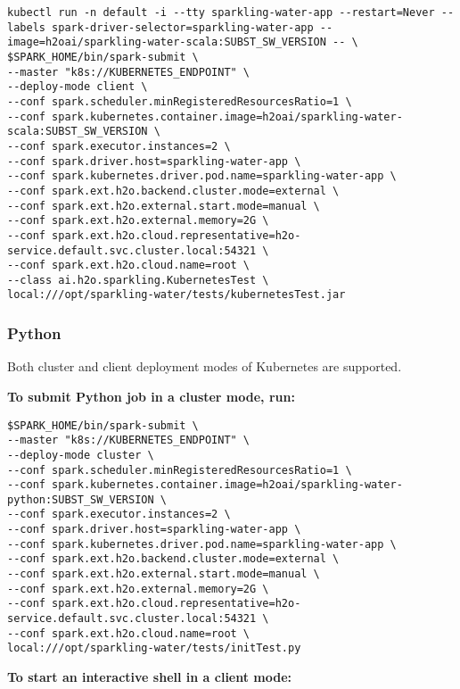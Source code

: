 \begin{lstlisting}[style=Bash]
kubectl run -n default -i --tty sparkling-water-app --restart=Never --labels spark-driver-selector=sparkling-water-app --image=h2oai/sparkling-water-scala:SUBST_SW_VERSION -- \
$SPARK_HOME/bin/spark-submit \
--master "k8s://KUBERNETES_ENDPOINT" \
--deploy-mode client \
--conf spark.scheduler.minRegisteredResourcesRatio=1 \
--conf spark.kubernetes.container.image=h2oai/sparkling-water-scala:SUBST_SW_VERSION \
--conf spark.executor.instances=2 \
--conf spark.driver.host=sparkling-water-app \
--conf spark.kubernetes.driver.pod.name=sparkling-water-app \
--conf spark.ext.h2o.backend.cluster.mode=external \
--conf spark.ext.h2o.external.start.mode=manual \
--conf spark.ext.h2o.external.memory=2G \
--conf spark.ext.h2o.cloud.representative=h2o-service.default.svc.cluster.local:54321 \
--conf spark.ext.h2o.cloud.name=root \
--class ai.h2o.sparkling.KubernetesTest \
local:///opt/sparkling-water/tests/kubernetesTest.jar
\end{lstlisting}


\subsubsection{Python}

Both cluster and client deployment modes of Kubernetes are supported.

\textbf{To submit Python job in a cluster mode, run:}

\begin{lstlisting}[style=Bash]
$SPARK_HOME/bin/spark-submit \
--master "k8s://KUBERNETES_ENDPOINT" \
--deploy-mode cluster \
--conf spark.scheduler.minRegisteredResourcesRatio=1 \
--conf spark.kubernetes.container.image=h2oai/sparkling-water-python:SUBST_SW_VERSION \
--conf spark.executor.instances=2 \
--conf spark.driver.host=sparkling-water-app \
--conf spark.kubernetes.driver.pod.name=sparkling-water-app \
--conf spark.ext.h2o.backend.cluster.mode=external \
--conf spark.ext.h2o.external.start.mode=manual \
--conf spark.ext.h2o.external.memory=2G \
--conf spark.ext.h2o.cloud.representative=h2o-service.default.svc.cluster.local:54321 \
--conf spark.ext.h2o.cloud.name=root \
local:///opt/sparkling-water/tests/initTest.py
\end{lstlisting}

\textbf{To start an interactive shell in a client mode:}

